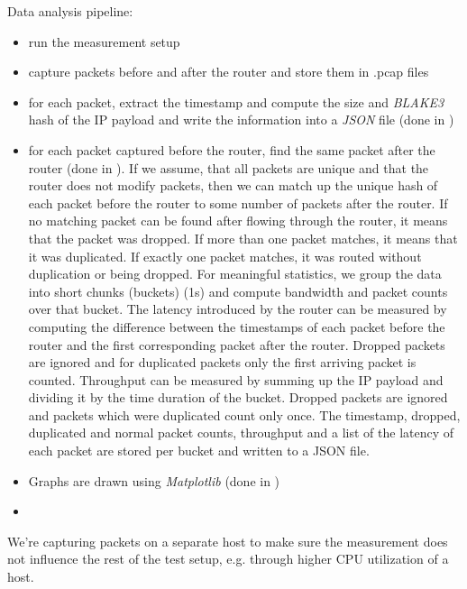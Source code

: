 Data analysis pipeline:
\begin{itemize}
  \item run the measurement setup
  \item capture packets before and after the router and store them in .pcap files
  \item for each packet, extract the timestamp and compute the size and \textit{BLAKE3} \cite{wiki:BLAKE3} hash of the IP payload and write the information into a \textit{JSON} \cite{wiki:JSON} file (done in )
  \item for each packet captured before the router, find the same packet after the router (done in ). If we assume, that all packets are unique and that the router does not modify packets, then we can match up the unique hash of each packet before the router to some number of packets after the router. If no matching packet can be found after flowing through the router, it means that the packet was dropped. If more than one packet matches, it means that it was duplicated. If exactly one packet matches, it was routed without duplication or being dropped. For meaningful statistics, we group the data into short chunks (buckets) (1s) and compute bandwidth and packet counts over that bucket. The latency introduced by the router can be measured by computing the difference between the timestamps of each packet before the router and the first corresponding packet after the router. Dropped packets are ignored and for duplicated packets only the first arriving packet is counted. Throughput can be measured by summing up the IP payload  and dividing it by the time duration of the bucket. Dropped packets are ignored and packets which were duplicated count only once. The timestamp, dropped, duplicated and normal packet counts, throughput and a list of the latency of each packet are stored per bucket and written to a JSON file.
  \item Graphs are drawn using \textit{Matplotlib} \cite{Matplotlib} (done in )
  \item {}
\end{itemize}


We're capturing packets on a separate host to make sure the measurement does not influence the rest of the test setup, e.g. through higher CPU utilization of a host.





\cite{RFC7858}
